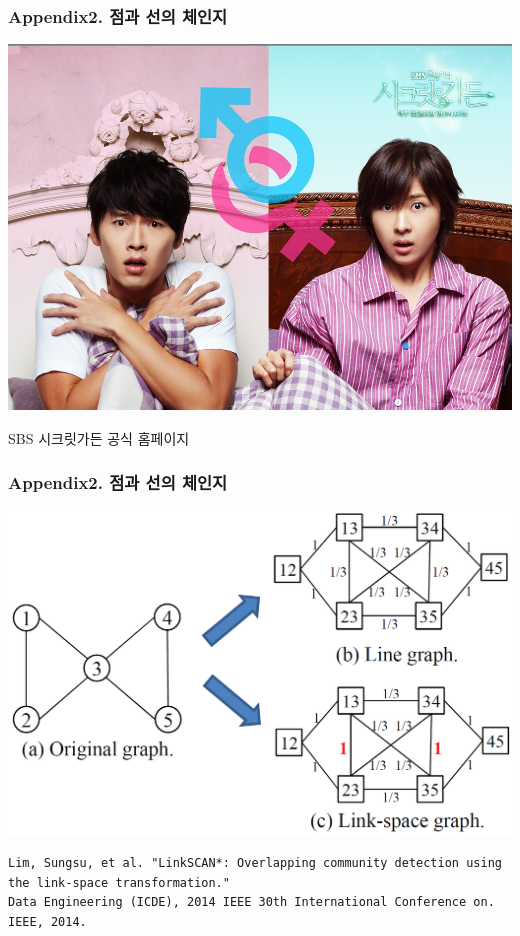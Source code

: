 \documentclass{beamer}
\begin{document}
\begin{frame}[fragile]
\frametitle{Appendix2. 점과 선의 체인지}
\begin{center}
\includegraphics[scale=0.23]{secretgarden.jpg}
\end{center}
\hfill
\tiny{SBS 시크릿가든 공식 홈페이지}
\end{frame}

\begin{frame}[fragile]
\frametitle{Appendix2. 점과 선의 체인지}
\begin{center}
\includegraphics[scale=0.25]{linkscan.png}
\end{center}
\hfill
\tiny{
\begin{Verbatim}
Lim, Sungsu, et al. "LinkSCAN*: Overlapping community detection using the link-space transformation."
Data Engineering (ICDE), 2014 IEEE 30th International Conference on. IEEE, 2014.
\end{Verbatim}
}
\end{frame}
\end{document}
